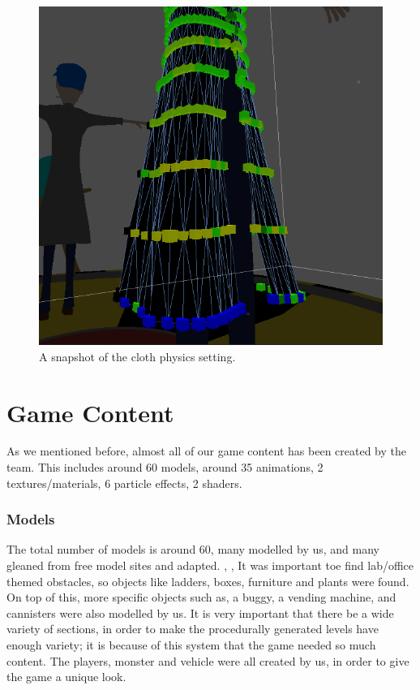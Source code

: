 \documentclass[a4paper,oneside]{memoir}
\begin{document}
         	     	   \begin{figure}[ht]
						\begin{center}
							\includegraphics[width=120mm]{"../Screenshots/Maya/cloth"}
							\caption{A snapshot of the cloth physics setting.}
							\label{fig:A snapshot of the cloth physics setting.}
						\end{center}
					\end{figure}


		\section{Game Content}
        
            As we mentioned before, almost all of our game content has been created by the team. This includes around 60 models, around 35 animations, 2 textures/materials, 6 particle effects, 2 shaders.
            
            \subsubsection{Models}
                The total number of models is around 60, many modelled by us, and many gleaned from free model sites and adapted. \cite{FreeModels1}, \cite{FreeModels2}, \cite{FreeModels3}
                It was important toe find lab/office themed obstacles, so objects like ladders, boxes, furniture and plants were found. On top of this, more specific objects such as, a buggy, a vending machine, and cannisters were also modelled by us.
                It is very important that there be a wide variety of sections, in order to make the procedurally generated levels have enough variety; it is because of this system that the game needed so much content.
                The players, monster and vehicle were all created by us, in order to give the game a unique look.
                
\end{document}
